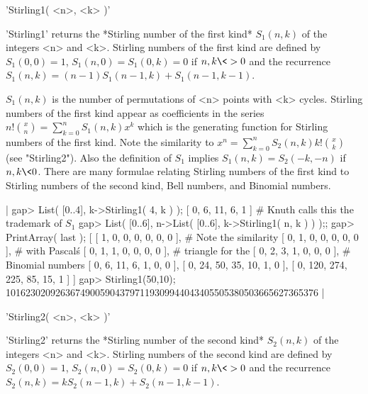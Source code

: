 %
%

'Stirling1( <n>, <k> )'

'Stirling1' returns the *Stirling number of the first kind* $S_1(n,k)$ of
the integers <n> and <k>.  Stirling numbers of the first kind are defined
by $S_1(0,0)  = 1$, $S_1(n,0) =  S_1(0,k) = 0$  if  $n, k \<> 0$  and the
recurrence $S_1(n,k) = (n-1) S_1(n-1,k) + S_1(n-1,k-1)$.

$S_1(n,k)$ is the number  of permutations of  <n> points with <k> cycles.
Stirling numbers of  the first kind  appear as coefficients in the series
$n! {x \choose n} = \sum_{k=0}^{n}{S_1(n,k) x^k}$ which is the generating
function for Stirling numbers of the first kind.  Note  the similarity to
$x^n =  \sum_{k=0}^{n}{S_2(n,k) k!  {x  \choose k}}$  (see  "Stirling2").
Also the definition of $S_1$ implies $S_1(n,k) = S_2(-k,-n)$ if $n,k\<0$.
There are  many  formulae relating Stirling numbers of  the first kind to
Stirling numbers of the second kind, Bell numbers, and Binomial numbers.

|    gap> List( [0..4], k->Stirling1( 4, k ) );
    [ 0, 6, 11, 6, 1 ]    # Knuth calls this the trademark of $S_1$
    gap> List( [0..6], n->List( [0..6], k->Stirling1( n, k ) ) );;
    gap> PrintArray( last );
    [ [    1,    0,    0,    0,    0,    0,    0 ],    # Note the similarity
      [    0,    1,    0,    0,    0,    0,    0 ],    # with Pascal\'s
      [    0,    1,    1,    0,    0,    0,    0 ],    # triangle for the
      [    0,    2,    3,    1,    0,    0,    0 ],    # Binomial numbers
      [    0,    6,   11,    6,    1,    0,    0 ],
      [    0,   24,   50,   35,   10,    1,    0 ],
      [    0,  120,  274,  225,   85,   15,    1 ] ]
    gap> Stirling1(50,10);
    101623020926367490059043797119309944043405505380503665627365376 |

%
%

'Stirling2( <n>, <k> )'

'Stirling2' returns the *Stirling number of  the  second kind* $S_2(n,k)$
of the integers <n>  and <k>.  Stirling  numbers  of the second  kind are
defined by $S_2(0,0) = 1$, $S_2(n,0) = S_2(0,k) = 0$ if $n,  k \<> 0$ and
the recurrence $S_2(n,k) = k S_2(n-1,k) + S_2(n-1,k-1)$.

